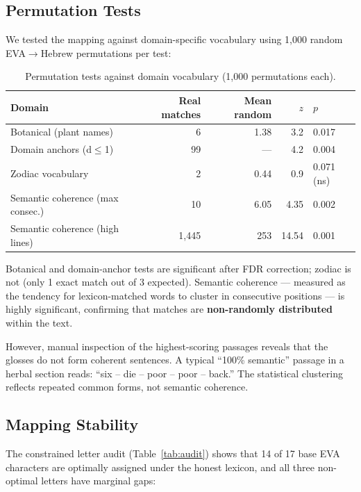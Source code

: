 \documentclass[11pt,a4paper]{article}
\begin{document}
\subsection{Permutation Tests}
\label{sec:permutation}

We tested the mapping against domain-specific vocabulary using 1,000 random
EVA$\to$Hebrew permutations per test:

\begin{table}[htbp]
\centering
\caption{Permutation tests against domain vocabulary (1,000 permutations each).}
\label{tab:permutation}
\small
\begin{tabular}{@{}lrrrl@{}}
\toprule
Domain & Real matches & Mean random & $z$ & $p$ \\
\midrule
Botanical (plant names) & 6 & 1.38 & 3.2 & 0.017 \\
Domain anchors (d$\le$1) & 99 & --- & 4.2 & 0.004 \\
Zodiac vocabulary & 2 & 0.44 & 0.9 & 0.071 (ns) \\
\midrule
Semantic coherence (max consec.) & 10 & 6.05 & 4.35 & 0.002 \\
Semantic coherence (high lines) & 1,445 & 253 & 14.54 & 0.001 \\
\bottomrule
\end{tabular}
\end{table}

Botanical and domain-anchor tests are significant after FDR correction;
zodiac is not (only 1 exact match out of 3 expected). Semantic coherence ---
measured as the tendency for lexicon-matched words to cluster in consecutive
positions --- is highly significant, confirming that matches are
\textbf{non-randomly distributed} within the text.

However, manual inspection of the highest-scoring passages reveals that the
glosses do not form coherent sentences. A typical ``100\% semantic'' passage
in a herbal section reads: ``six -- die -- poor -- poor -- back.'' The
statistical clustering reflects repeated common forms, not semantic coherence.

\subsection{Mapping Stability}
\label{sec:stability}

The constrained letter audit (Table~\ref{tab:audit}) shows that
14 of 17 base EVA characters are optimally assigned under the honest lexicon,
and all three non-optimal letters have marginal gaps:
\end{document}
